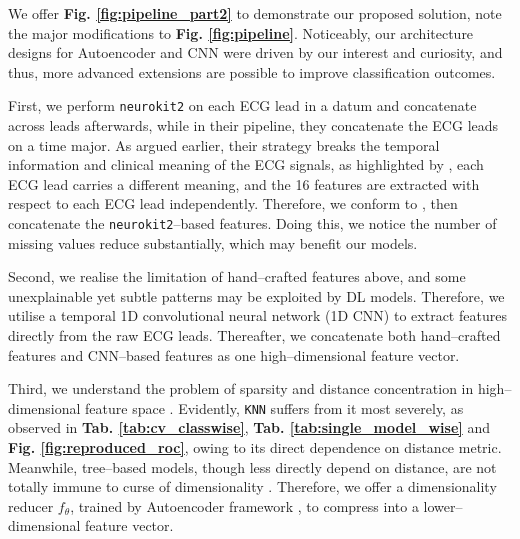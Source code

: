 \label{sec:part2_method}

We offer \textbf{Fig. \ref{fig:pipeline_part2}} to demonstrate our proposed solution, note the major modifications to \textbf{Fig. \ref{fig:pipeline}}.
Noticeably, our architecture designs for Autoencoder and CNN were driven by our interest and curiosity, and thus, more advanced extensions are possible to improve classification outcomes.

First, we perform \texttt{neurokit2} on each ECG lead in a datum and concatenate across leads afterwards, while in their pipeline, they concatenate the ECG leads on a time major.
As argued earlier, their strategy breaks the temporal information and clinical meaning of the ECG signals, as highlighted by \cite{GOLDBERGER2018xi}, each ECG lead carries a different meaning, and the 16 features are extracted with respect to each ECG lead independently.
Therefore, we conform to \cite{GOLDBERGER2018xi}, then concatenate the \texttt{neurokit2}–based features. Doing this, we notice the number of missing values reduce substantially, which may benefit our models.

Second, we realise the limitation of hand–crafted features above, and some unexplainable yet subtle patterns may be exploited by DL models. Therefore, we utilise a temporal 1D convolutional neural network (1D CNN) to extract features directly from the raw ECG leads.
Thereafter, we concatenate both hand–crafted features and CNN–based features as one high–dimensional feature vector.

Third, we understand the problem of sparsity and distance concentration in high–dimensional feature space \cite{peng2025interpretingcursedimensionalitydistance}.
Evidently, \texttt{KNN} suffers from it most severely, as observed in \textbf{Tab. \ref{tab:cv_classwise}}, \textbf{Tab. \ref{tab:single_model_wise}} and \textbf{Fig. \ref{fig:reproduced_roc}}, owing to its direct dependence on distance metric.
Meanwhile, tree–based models, though less directly depend on distance, are not totally immune to curse of dimensionality \cite{JMLR:v18:16-466}.
Therefore, we offer a dimensionality reducer $f_\theta$, trained by Autoencoder framework \cite{berahmand2024autoencoders}, to compress into a lower–dimensional feature vector.



